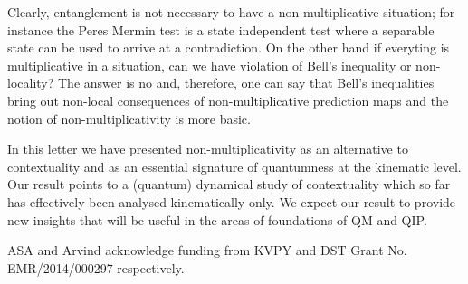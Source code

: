 \documentclass[british,aps,prl,superscriptaddress,nofootinbib,times,reprint]{revtex4-1}
\theoremstyle{plain}
\theoremstyle{plain}
\theoremstyle{definition}
\theoremstyle{remark}
\theoremstyle{remark}
\theoremstyle{remark}
\theoremstyle{plain}
\theoremstyle{plain}
\theoremstyle{plain}
\theoremstyle{definition}
\theoremstyle{definition}
\begin{document}
Clearly, entanglement is not necessary to have a
non-multiplicative situation; for instance the
Peres Mermin test is a state independent test
where a separable state can be used to arrive at a
contradiction. On the other hand if everyting is
multiplicative in a situation, can we have
violation of Bell's inequality or non-locality?
The answer is no and, therefore, one can say that
Bell's inequalities bring out  non-local
consequences of  non-multiplicative prediction
maps and the notion of non-multiplicativity is
more basic.  


In this letter we have presented
non-multiplicativity as an alternative to
contextuality and as an essential signature of
quantumness at the kinematic level. {\color{red} Our result
points to a (quantum) dynamical study of contextuality which 
so far has effectively been analysed kinematically only.}
We expect {\color{red}our result} to provide new insights that will be useful
in the areas of foundations of QM and QIP.

\begin{acknowledgments} ASA and Arvind acknowledge
funding from KVPY and DST Grant No.
EMR/2014/000297 respectively.
\end{acknowledgments}
%
 
\end{document}
